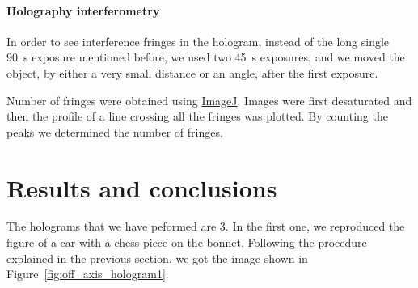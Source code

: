 \documentclass[11pt,a4paper]{article}
\begin{document}
\paragraph{Holography interferometry}
In order to see interference fringes in the hologram, instead of the long single \SI{90}{\second} exposure mentioned before, we used two \SI{45}{\second} exposures, and we moved the object, by either a very small distance or an angle, after the first exposure.

Number of fringes were obtained using \href{https://imagej.net/}{ImageJ}. Images were first desaturated and then the profile of a line crossing all the fringes was plotted. By counting the peaks we determined the number of fringes.


\section{Results and conclusions}
The holograms that we have peformed are 3. In the first one, we reproduced the figure of a car with a chess piece on the bonnet. Following the procedure explained in the previous section, we got the image shown in Figure~\ref{fig:off_axis_hologram1}.
\end{document}
